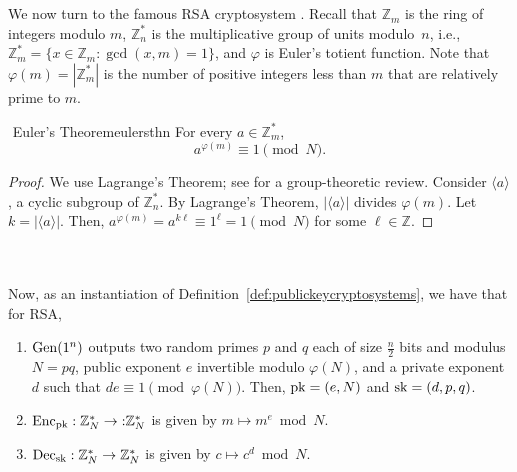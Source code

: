        \\
        \\
        We now turn to the famous RSA cryptosystem \cite{rivest1978rsa}. Recall that \(\mathbb{Z}_m\) is the ring of integers modulo \(m\), \(\mathbb{Z}_n^*\) is the multiplicative group of units modulo~\(n\), i.e., \(\mathbb{Z}_m^*=\{x\in\mathbb{Z}_m:\gcd(x,m)=1\}\), and \(\varphi\) is Euler's totient function. Note that \(\varphi(m)=|\mathbb{Z}_m^*|\) is the number of positive integers less than \(m\) that are relatively prime to \(m\).
        \begin{theorem}{\Stop\,\,Euler's Theorem}{eulersthn}
            For every \(a\in\mathbb{Z}_m^*\),
            \begin{equation*}
                a^{\varphi(m)}\equiv 1\pmod{N}.
            \end{equation*}
            \begin{proof}
                We use Lagrange's Theorem; see \cite{dummit2004abstract} for a group-theoretic review. Consider \(\langle a\rangle\), a cyclic subgroup of \(\mathbb{Z}_n^*\). By Lagrange's Theorem, \(|\langle a\rangle|\) divides \(\varphi(m)\). Let \(k=|\langle a\rangle|\). Then, \(a^{\varphi(m)}=a^{k\ell}\equiv1^\ell=1\pmod{N}\) for some \(\ell\in\mathbb{Z}\).
            \end{proof}
        \end{theorem}
        \vphantom
        \\
        \\
        Now, as an instantiation of Definition~\ref{def:publickeycryptosystems}, we have that for RSA,
        \begin{enumerate}
            \item \(\operatorname{Gen}(1^n)\) outputs two random primes \(p\) and \(q\) each of size \(\frac{n}{2}\) bits and modulus \(N=pq\),  public exponent \(e\) invertible modulo \(\varphi(N)\), and a private exponent \(d\) such that \(de\equiv 1\pmod{\varphi(N)}\). Then, \(\operatorname{pk}=(e,N)\) and \(\operatorname{sk}=(d,p,q)\).
            \item \(\operatorname{Enc}_{\operatorname{pk}}:\mathbb{Z}_N^*\to\mathbb:\mathbb{Z}_N^*\) is given by \(m\mapsto m^e\bmod N\).
            \item \(\operatorname{Dec}_{\operatorname{sk}}:\mathbb{Z}_N^*\to\mathbb{Z}_N^*\) is given by \(c\mapsto c^d\bmod N\).
        \end{enumerate}

